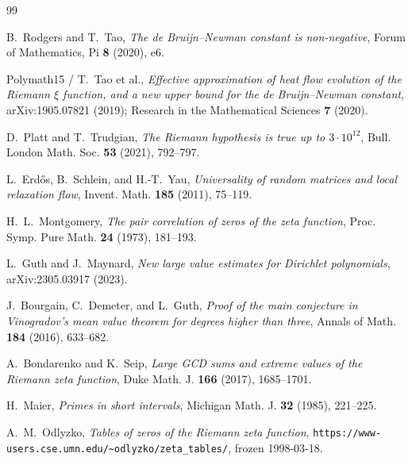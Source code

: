 \documentclass[11pt]{article}
\theoremstyle{definition}
\begin{document}
\begin{thebibliography}{99}

B.~Rodgers and T.~Tao,
\textit{The de Bruijn--Newman constant is non-negative},
Forum of Mathematics, Pi \textbf{8} (2020), e6.

Polymath15 / T.~Tao et al.,
\textit{Effective approximation of heat flow evolution of the Riemann $\xi$ function, and a new upper bound for the de Bruijn--Newman constant},
arXiv:1905.07821 (2019); Research in the Mathematical Sciences \textbf{7} (2020).

D.~Platt and T.~Trudgian,
\textit{The Riemann hypothesis is true up to $3\cdot 10^{12}$},
Bull. London Math. Soc. \textbf{53} (2021), 792--797.

L.~Erd\H{o}s, B.~Schlein, and H.-T.~Yau,
\textit{Universality of random matrices and local relaxation flow},
Invent. Math. \textbf{185} (2011), 75--119.

H.~L.~Montgomery,
\textit{The pair correlation of zeros of the zeta function},
Proc. Symp. Pure Math. \textbf{24} (1973), 181--193.

L.~Guth and J.~Maynard,
\textit{New large value estimates for Dirichlet polynomials},
arXiv:2305.03917 (2023).

J.~Bourgain, C.~Demeter, and L.~Guth,
\textit{Proof of the main conjecture in Vinogradov's mean value theorem for degrees higher than three},
Annals of Math. \textbf{184} (2016), 633--682.

A.~Bondarenko and K.~Seip,
\textit{Large GCD sums and extreme values of the Riemann zeta function},
Duke Math. J. \textbf{166} (2017), 1685--1701.

H.~Maier,
\textit{Primes in short intervals},
Michigan Math. J. \textbf{32} (1985), 221--225.

A.~M.~Odlyzko,
\textit{Tables of zeros of the Riemann zeta function},
\texttt{https://www-users.cse.umn.edu/\~{}odlyzko/zeta\_tables/}, frozen 1998-03-18.


\end{thebibliography}
\end{document}
